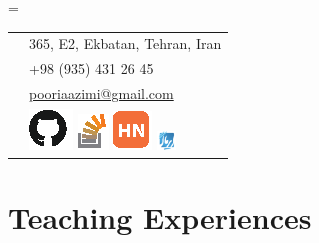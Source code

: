 \documentclass{tccv}
\begin{document}
{{\needspace{0.5\textheight}%
    \newdimen\boxwidth%
    \boxwidth=\dimexpr{}\fboxsep\relax%
    \colorbox[HTML]{BEDBE3}{%
    \begin{tabularx}{\boxwidth}{c|X}
	    \Writinghand & 
	    {365, E2, Ekbatan, Tehran, Iran}\smallskip\\
	    \Telefon     & 
	    {+98 (935) 431 26 45}\smallskip\\
	    \Letter      & 
	    \href{mailto:pooriaazimi@gmail.com}{pooriaazimi@gmail.com}
	    \\[3pt]
	     & 
%
		\href{https://github.com/pooriaazimi/}{\includegraphics{Logos/GitHub.eps}}
%
		\href{http://stackoverflow.com/users/347353/pooria-azimi}{\includegraphics{Logos/StackOverflow.eps}}
%
		\href{https://news.ycombinator.com/user?id=pooriaazimi}{\includegraphics{Logos/HN.eps}}
%		
		\href{http://forum.irmug.com}{\includegraphics[width=14pt]{Logos/IRMUG.pdf}}
%		
	\end{tabularx}}
	





\vspace{8pt}











\section{Teaching Experiences}

\begin{ta}


\end{ta}}}
\end{document}
